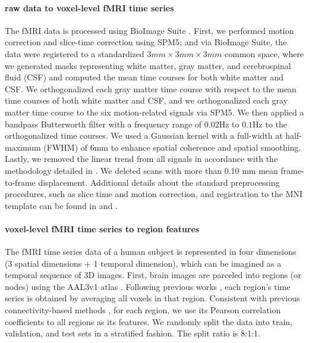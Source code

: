 \paragraph{raw data to voxel-level fMRI time series}
The fMRI data is processed using BioImage Suite \citep{joshi2011unified}. First, we performed motion correction and slice-time correction using SPM5; and via BioImage Suite, the data were registered to a standardized $3mm \times 3mm \times 3mm$ common space, where we generated masks representing white matter, gray matter, and cerebrospinal fluid (CSF) and computed the mean time courses for both white matter and CSF. We orthogonalized each gray matter time course with respect to the mean time courses of both white matter and CSF, and we orthogonalized each gray matter time course to the six motion-related signals via SPM5. We then applied a bandpass Butterworth filter with a frequency range of $0.02$Hz to $0.1$Hz to the orthogonalized time courses. We used a Gaussian kernel with a full-width at half-maximum (FWHM) of $6$mm to enhance spatial coherence and spatial smoothing. Lastly, we removed the linear trend from all signals in accordance with the methodology detailed in \cite{shenGroupwiseWholebrainParcellation2013}. We deleted scans with more than 0.10 mm mean frame-to-frame displacement. Additional details about the standard preprocessing procedures, such as slice time and motion correction, and registration to the MNI template can be found in \cite{greene2018task} and \cite{horien2019individual}.
\paragraph{voxel-level fMRI time series to region features}
The fMRI time series data of a human subject is represented in four dimensions (3 spatial dimensions + 1 temporal dimension), which can be imagined as a temporal sequence of 3D images. First, brain images are parceled into regions (or nodes) using the AAL3v1 atlas \citep{rolls2020automated}. Following previous works \citep{kan2022brain,li2021braingnn,thomas2022self}, each region's time series is obtained by averaging all voxels in that region. Consistent with previous connectivity-based methods \citep{li2021braingnn,kan2022brain,ktena2018metric,said2023neurograph}, for each region, we use its Pearson correlation coefficients to all regions as its features. We randomly split the data into train, validation, and test sets in a stratified fashion. The split ratio is 8:1:1.

